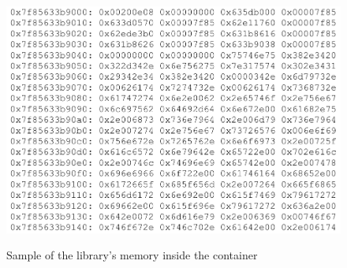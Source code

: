 \documentclass[10pt,journal,compsoc]{IEEEtran}
\newcommand{\marcos}[1]{{\color{green}{MARCOS: #1}}}
\begin{document}
%
%
%
%

%

\begin{figure}[htb!]
\footnotesize
\caption{Sample of the library's memory inside the container}
\includegraphics[scale=0.54]{conteudo-memoria-copia-gdb.pdf}
\centering
\label{fig:conteudo-memoria-copia-gdb}
\end{figure}
\end{document}
